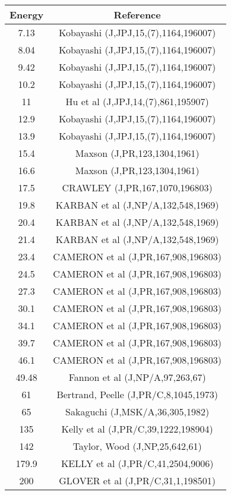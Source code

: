 \begin{tabular}{|c||c|} 
 \hline 
\bf{Energy} & \bf{Reference} \\
 \hline
 \hline 
7.13 & Kobayashi (J,JPJ,15,(7),1164,196007)\\
8.04 & Kobayashi (J,JPJ,15,(7),1164,196007)\\
9.42 & Kobayashi (J,JPJ,15,(7),1164,196007)\\
10.2 & Kobayashi (J,JPJ,15,(7),1164,196007)\\
11 & Hu et al (J,JPJ,14,(7),861,195907)\\
12.9 & Kobayashi (J,JPJ,15,(7),1164,196007)\\
13.9 & Kobayashi (J,JPJ,15,(7),1164,196007)\\
15.4 & Maxson (J,PR,123,1304,1961)\\
16.6 & Maxson (J,PR,123,1304,1961)\\
17.5 & CRAWLEY (J,PR,167,1070,196803)\\
19.8 & KARBAN et al (J,NP/A,132,548,1969)\\
20.4 & KARBAN et al (J,NP/A,132,548,1969)\\
21.4 & KARBAN et al (J,NP/A,132,548,1969)\\
23.4 & CAMERON et al (J,PR,167,908,196803)\\
24.5 & CAMERON et al (J,PR,167,908,196803)\\
27.3 & CAMERON et al (J,PR,167,908,196803)\\
30.1 & CAMERON et al (J,PR,167,908,196803)\\
34.1 & CAMERON et al (J,PR,167,908,196803)\\
39.7 & CAMERON et al (J,PR,167,908,196803)\\
46.1 & CAMERON et al (J,PR,167,908,196803)\\
49.48 & Fannon et al (J,NP/A,97,263,67)\\
61 & Bertrand, Peelle (J,PR/C,8,1045,1973)\\
65 & Sakaguchi (J,MSK/A,36,305,1982)\\
135 & Kelly et al (J,PR/C,39,1222,198904)\\
142 & Taylor, Wood (J,NP,25,642,61)\\
179.9 & KELLY et al (J,PR/C,41,2504,9006)\\
200 & GLOVER et al (J,PR/C,31,1,198501)\\
\end{tabular}